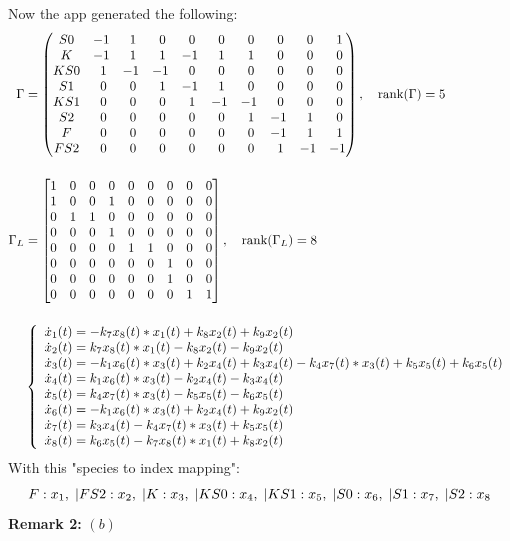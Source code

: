 Now the app generated the following:
\begin{align*}
	\Gamma &=
	\begin{pmatrix}
		S0& -1&\ 1&\ 0&\ 0&\ 0&\ 0&\ 0&\ 0&\ 1\cr K& -1&\ 1&\ 1& -1&\ 1&\ 1&\ 0&\ 0&\ 0\cr KS0&\ 1& -1& -1&\ 0&\ 0&\ 0&\ 0&\ 0&\ 0\cr S1&\ 0&\ 0&\ 1& -1&\ 1&\ 0&\ 0&\ 0&\ 0\cr KS1&\ 0&\ 0&\ 0&\ 1& -1& -1&\ 0&\ 0&\ 0\cr S2&\ 0&\ 0&\ 0&\ 0&\ 0&\ 1& -1&\ 1&\ 0\cr F&\ 0&\ 0&\ 0&\ 0&\ 0&\ 0& -1&\ 1&\ 1\cr FS2&\ 0&\ 0&\ 0&\ 0&\ 0&\ 0&\ 1& -1& -1\cr
	\end{pmatrix}, \quad \text{rank}(\Gamma) = 5 \\[3ex]
	\Gamma_L &=
	\begin{bmatrix}
		1 & 0 & 0& 0& 0& 0& 0& 0& 0 \\
		1 & 0 & 0& 1& 0& 0& 0& 0& 0 \\
		0 & 1 & 1& 0& 0& 0& 0& 0& 0 \\
		0 & 0 & 0& 1& 0& 0& 0& 0& 0 \\
		0 & 0 & 0& 0& 1& 1& 0& 0& 0 \\
		0 & 0 & 0& 0& 0& 0& 1& 0& 0 \\
		0 & 0 & 0& 0& 0& 0& 1& 0& 0 \\
		0 & 0 & 0& 0& 0& 0& 0& 1& 1 \\
	\end{bmatrix}, \quad \text{rank}(\Gamma_L) = 8 \\[3ex]
	&
	\begin{cases*}
		\begin{array}{ll}
			\dot{x}_1(t) = -k_7 x_8(t) *x_1(t)+k_8 x_2(t)+k_9 x_2(t) \\
			\dot{x}_2(t) = k_7 x_8(t) *x_1(t)-k_8 x_2(t)-k_9 x_2(t) \\
			\dot{x}_3(t) = -k_1 x_6(t) *x_3(t)+k_2 x_4(t)+k_3 x_4(t)-k_4 x_7(t) *x_3(t)+k_5 x_5(t)+k_6 x_5(t) \\
			\dot{x}_4(t) = k_1 x_6(t) *x_3(t)-k_2 x_4(t)-k_3 x_4(t) \\
			\dot{x}_5(t) = k_4 x_7(t) *x_3(t)-k_5 x_5(t)-k_6 x_5(t) \\
			\dot{x}_6(t) = -k_1 x_6(t) *x_3(t)+k_2 x_4(t)+k_9 x_2(t) \\
			\dot{x}_7(t) = k_3 x_4(t)-k_4 x_7(t) *x_3(t)+k_5 x_5(t) \\
			\dot{x}_8(t) = k_6 x_5(t)-k_7 x_8(t) *x_1(t)+k_8 x_2(t) \\
		\end{array}	
	\end{cases*}
\end{align*}
With this "species to index mapping":
\[
	F: x_1, \hspace{1mm}
	| FS2: x_2, \hspace{1mm}
	| K: x_3, \hspace{1mm}
	| KS0: x_4, \hspace{1mm}
	| KS1: x_5, \hspace{1mm}
	| S0: x_6, \hspace{1mm}
	| S1: x_7, \hspace{1mm}
	| S2: x_8
\]
\textbf{Remark 2:} $(b)$
